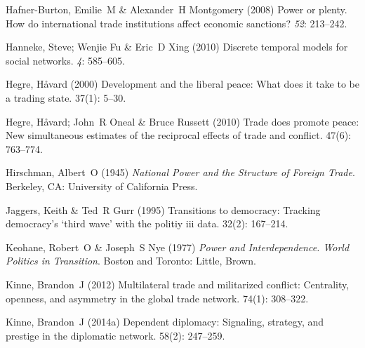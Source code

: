 \documentclass[12pt]{article}
\theoremstyle{hypothesis}
\begin{document}
\begin{thebibliography}{}
Hafner-Burton, Emilie~M  \& Alexander~H Montgomery (2008) Power or plenty. How
  do international trade institutions affect economic sanctions?
 {\em 52}: 213--242.

Hanneke, Steve; Wenjie Fu  \& Eric~D Xing (2010) Discrete temporal models for
  social networks.
 {\em 4}: 585--605.

Hegre, H\r{a}vard (2000) Development and the liberal peace: What does it take to be
  a trading state.
 { 37\/}(1): 5--30.

Hegre, H\r{a}vard; John~R Oneal  \& Bruce Russett (2010) Trade does promote peace:
  New simultaneous estimates of the reciprocal effects of trade and conflict.
 { 47\/}(6): 763--774.

Hirschman, Albert~O (1945) {\em National Power and the Structure of Foreign
  Trade}.
\newblock Berkeley, CA: University of California Press.

Jaggers, Keith  \& Ted~R Gurr (1995) Transitions to democracy: Tracking
  democracy's `third wave' with the politiy iii data.
 { 32\/}(2): 167--214.

Keohane, Robert~O  \& Joseph~S Nye (1977) {\em Power and Interdependence. World
  Politics in Transition}.
\newblock Boston and Toronto: Little, Brown.

Kinne, Brandon~J (2012) Multilateral trade and militarized conflict:
  Centrality, openness, and asymmetry in the global trade network.
 { 74\/}(1): 308--322.

Kinne, Brandon~J (2014a) Dependent diplomacy: Signaling, strategy, and prestige
  in the diplomatic network.
 { 58\/}(2): 247--259.


\end{thebibliography}
\end{document}
